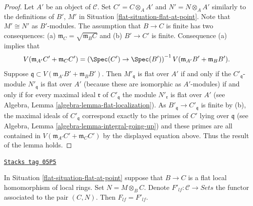 \begin{proof}

Let $A'$ be an object of $\mathcal{C}$. Set $C' = C \otimes_A A'$
and $N' = N \otimes_A A'$ similarly to the definitions of $B'$, $M'$ in
Situation \ref{flat-situation-flat-at-point}.
Note that $M' \cong N'$ as $B'$-modules.
The assumption that $B \to C$ is finite has two consequences:
(a) $\mathfrak m_C = \sqrt{\mathfrak m_B C}$ and (b)
$B' \to C'$ is finite. Consequence (a) implies that
$$
V(\mathfrak m_{A'}C' + \mathfrak m_C C')
=
\left(
\Spec(C') \to \Spec(B')
\right)^{-1}V(\mathfrak m_{A'}B' + \mathfrak m_B B').
$$
Suppose $\mathfrak q \subset V(\mathfrak m_{A'}B' + \mathfrak m_B B')$.
Then $M'_{\mathfrak q}$ is flat over $A'$ if and only if
the $C'_{\mathfrak q}$-module $N'_{\mathfrak q}$ is flat over $A'$
(because these are isomorphic as $A'$-modules) if and only if
for every maximal ideal $\mathfrak r$ of $C'_{\mathfrak q}$
the module $N'_{\mathfrak r}$ is flat over $A'$ (see
Algebra, Lemma \ref{algebra-lemma-flat-localization}).
As $B'_{\mathfrak q} \to C'_{\mathfrak q}$ is finite by (b),
the maximal ideals of $C'_{\mathfrak q}$ correspond exactly
to the primes of $C'$ lying over $\mathfrak q$ (see
Algebra, Lemma \ref{algebra-lemma-integral-going-up})
and these primes are all contained in
$V(\mathfrak m_{A'}C' + \mathfrak m_C C')$ by
the displayed equation above. Thus the result of the lemma holds.
\end{proof}

\begin{lemma}
\label{flat-lemma-flat-at-point-go-up}
\href{https://stacks.math.columbia.edu/tag/05P5}{\texttt{Stacks tag 05P5}}

In
Situation \ref{flat-situation-flat-at-point}
suppose that $B \to C$ is a flat local homomorphism of local
rings. Set $N = M \otimes_B C$. Denote
$F'_{lf} : \mathcal{C} \to \textit{Sets}$ the functor associated
to the pair $(C, N)$. Then $F_{lf} = F'_{lf}$.
\end{lemma}

